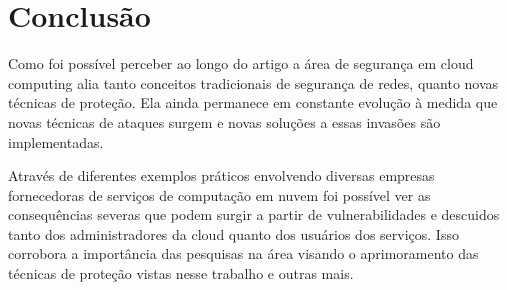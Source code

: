 \documentclass[brazil,12pt]{article}
\begin{document}
\section{Conclusão}
Como foi possível perceber ao longo do artigo a área de segurança em cloud
computing alia tanto conceitos tradicionais de segurança de redes, quanto novas
técnicas de proteção. Ela ainda permanece em constante evolução à medida que
novas técnicas de ataques surgem e novas soluções a essas invasões são
implementadas.

Através de diferentes exemplos práticos envolvendo diversas empresas
fornecedoras de serviços de computação em nuvem foi possível ver as
consequências severas que podem surgir a partir de vulnerabilidades e descuidos
tanto dos administradores da cloud quanto dos usuários dos serviços. Isso
corrobora a importância das pesquisas na área visando o aprimoramento das
técnicas de proteção vistas nesse trabalho e outras mais.

\nocite{*}


\end{document}
